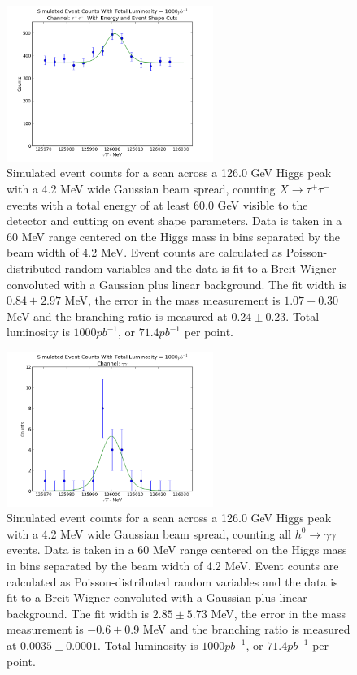 \documentclass[a4paper]{article}
\begin{document}
\begin{figure}[H]
	\includegraphics[width=0.6\textwidth]{data-fit-tt-cut}
	\caption{Simulated event counts for a scan across a 126.0 GeV Higgs peak with a 4.2 MeV wide Gaussian beam spread, counting $X\rightarrow \tau^+\tau^-$ events with a total energy of at least 60.0 GeV visible to the detector and cutting on event shape parameters. Data is taken in a 60 MeV range centered on the Higgs mass in bins separated by the beam width of 4.2 MeV. Event counts are calculated as Poisson-distributed random variables and the data is fit to a Breit-Wigner convoluted with a Gaussian plus linear background. The fit width is $0.84\pm2.97$ MeV, the error in the mass measurement is $1.07\pm0.30$ MeV and the branching ratio is measured at $0.24\pm0.23$. Total luminosity is $1000pb^{-1}$, or $71.4pb^{-1}$ per point.}
\label{data-fit-tt-cut}
\end{figure}

\begin{figure}[H]
	\includegraphics[width=0.6\textwidth]{data-fit-gg-cut}
	\caption{Simulated event counts for a scan across a 126.0 GeV Higgs peak with a 4.2 MeV wide Gaussian beam spread, counting all $h^0\rightarrow \gamma\gamma$ events. Data is taken in a 60 MeV range centered on the Higgs mass in bins separated by the beam width of 4.2 MeV. Event counts are calculated as Poisson-distributed random variables and the data is fit to a Breit-Wigner convoluted with a Gaussian plus linear background. The fit width is $2.85\pm5.73$ MeV, the error in the mass measurement is $-0.6\pm0.9$ MeV and the branching ratio is measured at $0.0035\pm0.0001$. Total luminosity is $1000pb^{-1}$, or $71.4 pb^{-1}$ per point.}
\label{data-fit-gg-cut}
\end{figure}
\end{document}
